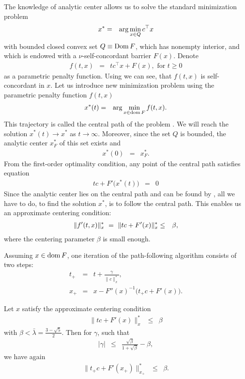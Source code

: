 The knowledge of analytic center allows us to solve the standard minimization problem
\begin{eqnarray}
  x^* &=& \arg\min_{x\in Q} c^\top x \labeleq{SDP:scb:standardProblem}
\end{eqnarray}
with bounded closed convex set $Q \equiv \operatorname{Dom} F$, which has nonempty interior, and which is endowed with a $\nu$-self-concordant barrier $F(x)$.
Denote
\begin{eqnarray}
  f(t,x) &=& tc^\top x + F(x), \text{ for } t \geq 0
\end{eqnarray}
as a parametric penalty function.
Using  we can see, that $f(t,x)$ is self-concordant in $x$.
Let us introduce new minimization problem using the parametric penalty function $f(t,x)$
\begin{eqnarray}
  x^*(t) &=& \arg\min_{x\in\operatorname{dom} F} f(t,x).
\end{eqnarray}
This trajectory is called the central path of the problem .
We will reach the solution $x^*(t) \rightarrow x^*$ as $t \rightarrow \infty$.
Moreover, since the set $Q$ is bounded, the analytic center $x^*_F$ of this set exists and
\begin{eqnarray}
  x^*(0) &=& x^*_F.
\end{eqnarray}
From the first-order optimality condition, any point of the central path satisfies equation
\begin{eqnarray}
  tc + F'\big(x^*(t)\big) &=& 0
\end{eqnarray}
Since the analytic center lies on the central path and can be found by , all we have to do, to find the solution $x^*$, is to follow the central path. 
This enables us an approximate centering condition:
\begin{eqnarray}
  \|f'(t,x)\|^*_x\ =\ \|tc + F'(x)\|^*_x &\leq& \beta, \labeleq{SDP:scb:cntrCondition}
\end{eqnarray}
where the centering parameter $\beta$ is small enough.

Assuming $x\in\operatorname{dom} F$, one iteration of the path-following algorithm consists of two steps:
\begin{eqnarray}
  t_+ &=& t + \frac{\gamma}{\|c\|^*_x},\\
  x_+ &=& x - F''(x)^{-1}\big(t_+c+F'(x)\big).
\end{eqnarray}

\begin{theorem}
  Let $x$ satisfy the approximate centering condition 
  \begin{eqnarray}
    \|tc + F'(x)\|^*_x &\leq& \beta
  \end{eqnarray}
  with $\beta < \bar{\lambda} = \frac{3-\sqrt{5}}{2}$.
  Then for $\gamma$, such that
  \begin{eqnarray}
    |\gamma| &\leq& \frac{\sqrt{\beta}}{1+\sqrt{\beta}} - \beta,
  \end{eqnarray}
  we have again
  \begin{eqnarray}
    \|t_+c + F'(x_+)\|^*_{x_+} &\leq& \beta.
  \end{eqnarray}
\end{theorem}

